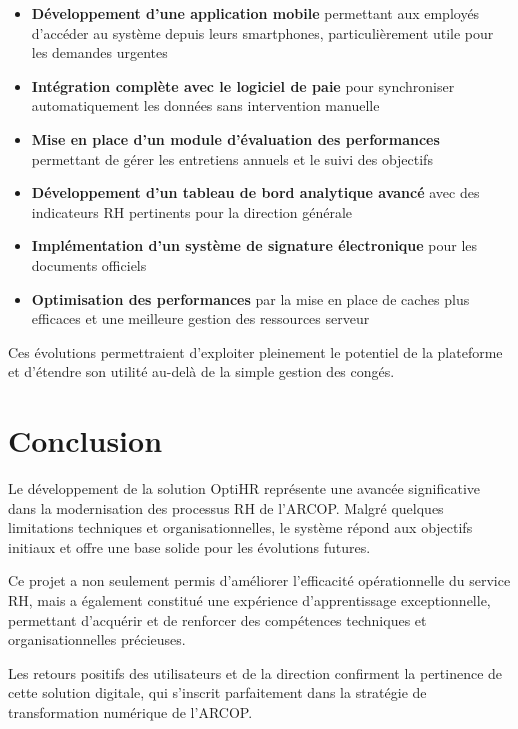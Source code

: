 \begin{itemize}
    \item \textbf{Développement d'une application mobile} permettant aux employés d'accéder au système depuis leurs smartphones, particulièrement utile pour les demandes urgentes
    
    \item \textbf{Intégration complète avec le logiciel de paie} pour synchroniser automatiquement les données sans intervention manuelle
    
    \item \textbf{Mise en place d'un module d'évaluation des performances} permettant de gérer les entretiens annuels et le suivi des objectifs
    
    \item \textbf{Développement d'un tableau de bord analytique avancé} avec des indicateurs RH pertinents pour la direction générale
    
    \item \textbf{Implémentation d'un système de signature électronique} pour les documents officiels
    
    \item \textbf{Optimisation des performances} par la mise en place de caches plus efficaces et une meilleure gestion des ressources serveur
\end{itemize}

Ces évolutions permettraient d'exploiter pleinement le potentiel de la plateforme et d'étendre son utilité au-delà de la simple gestion des congés.

\section{Conclusion}
Le développement de la solution OptiHR représente une avancée significative dans la modernisation des processus RH de l'ARCOP. Malgré quelques limitations techniques et organisationnelles, le système répond aux objectifs initiaux et offre une base solide pour les évolutions futures.

Ce projet a non seulement permis d'améliorer l'efficacité opérationnelle du service RH, mais a également constitué une expérience d'apprentissage exceptionnelle, permettant d'acquérir et de renforcer des compétences techniques et organisationnelles précieuses.

Les retours positifs des utilisateurs et de la direction confirment la pertinence de cette solution digitale, qui s'inscrit parfaitement dans la stratégie de transformation numérique de l'ARCOP.
\clearpage